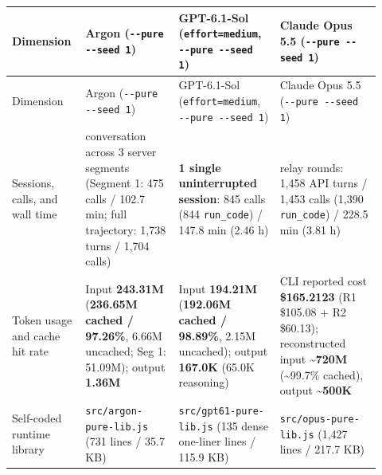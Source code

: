 \documentclass[11pt,a4paper]{article}
\begin{document}
{\small\setlength{\tabcolsep}{3pt}
\begin{longtable}{@{}>{\RaggedRight\arraybackslash}p{0.16\linewidth}>{\RaggedRight\arraybackslash}p{0.24\linewidth}>{\RaggedRight\arraybackslash}p{0.26\linewidth}>{\RaggedRight\arraybackslash}p{0.26\linewidth}@{}}
\toprule
Dimension & Argon (\texttt{-\allowbreak{}-\allowbreak{}pure\allowbreak{} \allowbreak{}-\allowbreak{}-\allowbreak{}seed\allowbreak{} \allowbreak{}1}) & GPT-6.1-Sol (\texttt{effort\allowbreak{}=\allowbreak{}medium}, \texttt{-\allowbreak{}-\allowbreak{}pure\allowbreak{} \allowbreak{}-\allowbreak{}-\allowbreak{}seed\allowbreak{} \allowbreak{}1}) & Claude Opus 5.5 (\texttt{-\allowbreak{}-\allowbreak{}pure\allowbreak{} \allowbreak{}-\allowbreak{}-\allowbreak{}seed\allowbreak{} \allowbreak{}1}) \\
\midrule\endfirsthead
\toprule
Dimension & Argon (\texttt{-\allowbreak{}-\allowbreak{}pure\allowbreak{} \allowbreak{}-\allowbreak{}-\allowbreak{}seed\allowbreak{} \allowbreak{}1}) & GPT-6.1-Sol (\texttt{effort\allowbreak{}=\allowbreak{}medium}, \texttt{-\allowbreak{}-\allowbreak{}pure\allowbreak{} \allowbreak{}-\allowbreak{}-\allowbreak{}seed\allowbreak{} \allowbreak{}1}) & Claude Opus 5.5 (\texttt{-\allowbreak{}-\allowbreak{}pure\allowbreak{} \allowbreak{}-\allowbreak{}-\allowbreak{}seed\allowbreak{} \allowbreak{}1}) \\
\midrule\endhead
\bottomrule\endfoot
Sessions, calls, and wall time & 1 conversation across 3 server segments (Segment 1: 475 calls / 102.7 min; full trajectory: 1,738 turns / 1,704 calls) & \textbf{1 single uninterrupted session}: 845 calls (844 \texttt{run\allowbreak{}\_\allowbreak{}code}) / 147.8 min (2.46 h) & 2 relay rounds: 1,458 API turns / 1,453 calls (1,390 \texttt{run\allowbreak{}\_\allowbreak{}code}) / 228.5 min (3.81 h) \\
Token usage and cache hit rate & Input \textbf{243.31M} (\textbf{236.65M cached / 97.26\%}, 6.66M uncached; Seg 1: 51.09M); output \textbf{1.36M} & Input \textbf{194.21M} (\textbf{192.06M cached / 98.89\%}, 2.15M uncached); output \textbf{167.0K} (65.0K reasoning) & CLI reported cost \textbf{\$165.2123} (R1 \$105.08 + R2 \$60.13); reconstructed input \textbf{\textasciitilde{}720M} (\textasciitilde{}99.7\% cached), output \textbf{\textasciitilde{}500K} \\
Self-coded runtime library & \texttt{src\allowbreak{}/\allowbreak{}argon\allowbreak{}-\allowbreak{}pure\allowbreak{}-\allowbreak{}lib\allowbreak{}.\allowbreak{}js} (731 lines / 35.7 KB) & \texttt{src\allowbreak{}/\allowbreak{}gpt61\allowbreak{}-\allowbreak{}pure\allowbreak{}-\allowbreak{}lib\allowbreak{}.\allowbreak{}js} (135 dense one-liner lines / 115.9 KB) & \texttt{src\allowbreak{}/\allowbreak{}opus\allowbreak{}-\allowbreak{}pure\allowbreak{}-\allowbreak{}lib\allowbreak{}.\allowbreak{}js} (1,427 lines / 217.7 KB) \\

\end{longtable}}
\end{document}

